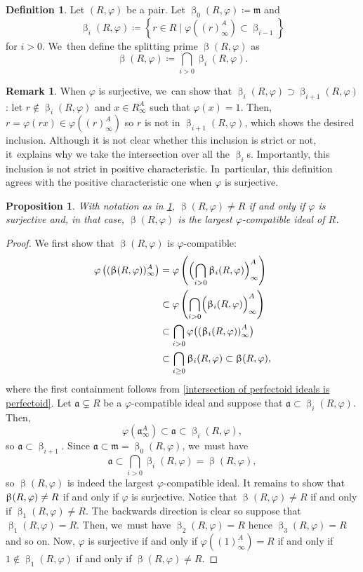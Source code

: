 \documentclass[11pt]{article}
\let\autoref\cref
\theoremstyle{plain}
\newtheorem{proposition}[theorem]{Proposition}
\theoremstyle{definition}
\newtheorem{definition}[theorem]{Definition}
\newtheorem{remark}[theorem]{Remark}
\numberwithin{equation}{theorem}
\newcommand{\fra}{\mathfrak{a}}
\newcommand{\fram}{\mathfrak{m}}
\renewcommand{\phi}{\varphi}
\newcommand{\rphi}{(R,\phi)}
\newcommand{\rafty}{R^A_\infty}
\begin{document}
\begin{definition}\label{definition splitting prime}
Let $\rphi$ be a pair. Let $\upbeta_0\rphi\coloneqq \fram$ and
\[
\upbeta_i\rphi\coloneqq \left\{r\in R\mid \phi\left((r)^A_\infty\right)\subset\upbeta_{i-1}\right\}
\]
for $i>0$. We~then define the splitting prime $\upbeta\rphi$ as
\[
\upbeta\rphi\coloneqq \bigcap_{i>0}\upbeta_i\rphi.
\]
\end{definition}

\begin{remark}
When $\phi$ is surjective, we~can show that $\upbeta_i\rphi\supset\upbeta_{i+1}\rphi$: let $r\notin \upbeta_i\rphi$ and $x\in \rafty$ such that $\phi(x)=1$. Then, $r=\phi(rx)\in \phi\left((r)_\infty^A\right)$ so $r$ is not in $\upbeta_{i+1}\rphi$, which shows the desired inclusion. Although it is not clear whether this inclusion is strict or not, it~explains why we take the intersection over all the $\upbeta_i$s. Importantly, this inclusion is not strict in positive characteristic. In~particular, this definition agrees with the positive characteristic one when $\phi$ is surjective.
\end{remark}

\begin{proposition}\label{basic ppties splitting prime}
With notation as in \autoref{definition splitting prime}, $\upbeta\rphi\neq R$ if and only if $\phi$ is surjective and, in that case, $\upbeta\rphi$ is the largest $\phi$-compatible ideal of $R$.
\end{proposition}

\begin{proof}
We first show that $\upbeta\rphi$ is $\phi$-compatible:
\begin{align*}
\phi\left((\upbeta\rphi)^A_\infty\right)&=\phi\left(\Bigl(\bigcap_{i>0} \upbeta_i\rphi\Bigr)^A_\infty\right)\\
&\subset \phi\left(\bigcap_{i>0} \Bigl(\upbeta_i\rphi \Bigr)^A_\infty \right) \\
&\subset \bigcap_{i>0} \phi\bigl( \left(\upbeta_i\rphi\right)^A_\infty\bigr) \\
&\subset \bigcap_{i\geq 0} \upbeta_i\rphi \subset \upbeta\rphi,
\end{align*}
where the first containment follows from \autoref{intersection of perfectoid ideals is perfectoid}.
Let $\fra\subsetneq R$ be a $\phi$-compatible ideal and suppose that $\fra\subset\upbeta_i\rphi$. Then,
\[
\phi\left(\fra^A_\infty\right)\subset \fra\subset \upbeta_i\rphi,
\]
so $\fra\subset\upbeta_{i+1}$. Since $\fra\subset\fram=\upbeta_0\rphi$, we~must have
\[
\fra\subset \bigcap_{i>0}\upbeta_i\rphi= \upbeta\rphi,
\]
so $\upbeta\rphi$ is indeed the largest $\phi$-compatible ideal. It remains to show that $\upbeta\rphi\neq\nobreak R$ if and only if $\phi$ is surjective. Notice that $\upbeta\rphi\neq R$ if and only if $\upbeta_1\rphi\neq R$. The backwards direction is clear so suppose that $\upbeta_1\rphi=R$. Then, we~must have $\upbeta_2\rphi=R$ hence $\upbeta_3\rphi=R$ and so on. Now, $\phi$ is surjective if and only if $\phi\left((1)^A_\infty\right)=R$ if and only if $1\notin \upbeta_1\rphi$ if and only if $\upbeta\rphi\neq R$.
\end{proof}
\end{document}
